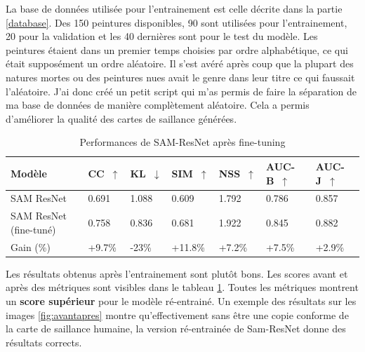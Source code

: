 \par
La base de données utilisée pour l'entrainement est celle décrite dans la partie \ref{database}. Des 150 peintures disponibles, 90 sont utilisées pour l'entrainement, 20 pour la validation et les 40 dernières sont pour le test du modèle. Les peintures étaient dans un premier temps choisies par ordre alphabétique, ce qui était supposément un ordre aléatoire. Il s'est avéré après coup que la plupart des natures mortes ou des peintures nues avait le genre dans leur titre ce qui faussait l'aléatoire. J'ai donc créé un petit script qui m'as permis de faire la séparation de ma base de données de manière complètement aléatoire. Cela a permis d'améliorer la qualité des cartes de saillance générées.

\begin{table}[ht]
    \centering
    \begin{tabular}{|l|l|l|l|l|l|l|}
        \hline
        Modèle & CC~$\uparrow$ & KL~$\downarrow$ & SIM~$\uparrow$ & NSS~$\uparrow$ & AUC-B~$\uparrow$ & AUC-J~$\uparrow$\\
        \hline
        SAM ResNet              & 0.691 & 1.088 & 0.609 & 1.792 & 0.786 & 0.857\\
        SAM ResNet (fine-tuné)  & 0.758 & 0.836 & 0.681 & 1.922 & 0.845 & 0.882\\
        \hline
        Gain (\%)               & +9.7\% & -23\% & +11.8\% & +7.2\% & +7.5\% & +2.9\%\\
        \hline
    \end{tabular}
    \caption{Performances de SAM-ResNet après fine-tuning}
    \label{tab:scoresfinetuned}
\end{table}

\par
Les résultats obtenus après l'entrainement sont plutôt bons. Les scores avant et après des métriques sont visibles dans le tableau \ref{tab:scoresfinetuned}. Toutes les métriques montrent un \textbf{score supérieur} pour le modèle ré-entrainé. Un exemple des résultats sur les images \ref{fig:avantapres} montre qu'effectivement sans être une copie conforme de la carte de saillance humaine, la version ré-entrainée de Sam-ResNet donne des résultats corrects.

